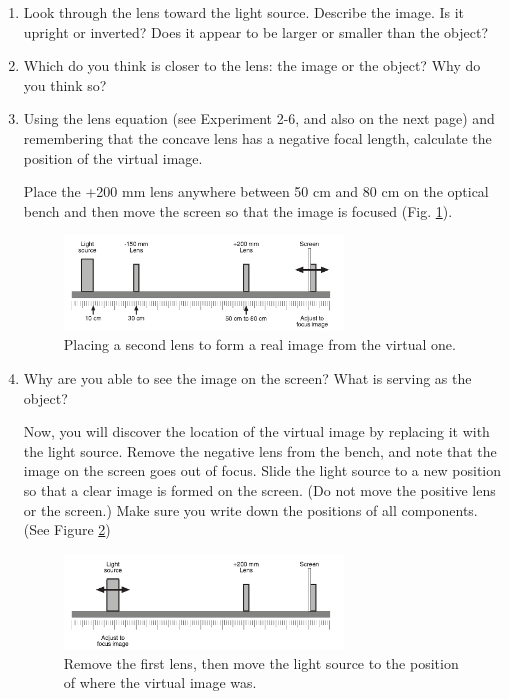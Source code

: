\begin{enumerate}
\item Look through the lens toward the light source. Describe the image. Is it upright or inverted? Does it appear to be larger or smaller than the
object?

\item Which do you think is closer to the lens: the image or the object? Why do you think so?

\item Using the lens equation (see Experiment 2-6, and also on the next page) and remembering that the concave lens has a negative focal length, calculate the position of the virtual image.

\noindent Place the +200 mm lens anywhere between 50 cm and 80 cm on the optical bench and then move the screen so that the image is focused (Fig. \ref{virt2}).
\begin{figure}[h]
\centering
\includegraphics[width=0.7\textwidth]{./Exp7/pic/virtual-2.png}
\caption{Placing a second lens to form a real image from the virtual one.}
\label{virt2}
\end{figure}

\item Why are you able to see the image on the screen? What is serving as the object?

\noindent Now, you will discover the location of the virtual image by replacing it with the light source. Remove the negative lens from the bench, and note that the image on the screen goes out of focus. Slide the light source to a new position so that a clear image is formed on the screen. (Do not move the positive lens or the screen.) Make sure you write down the positions of all components. (See Figure \ref{virtu3})

\begin{figure}[h]
\centering
\includegraphics[width=0.7\textwidth]{./Exp7/pic/virtual-3.png}
\caption{Remove the first lens, then move the light source to the position of where the virtual image was.}
\label{virtu3}
\end{figure}


\end{enumerate}
